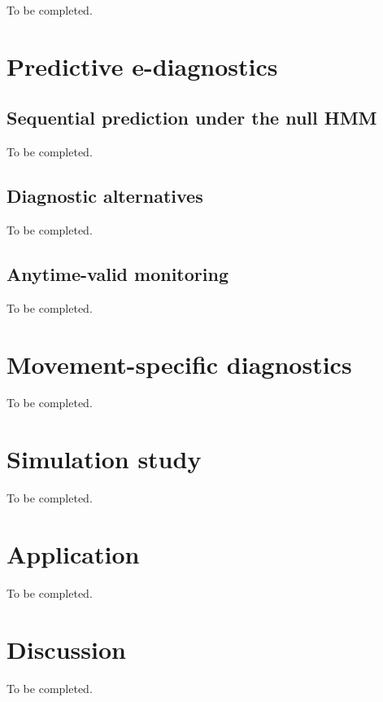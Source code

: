 \documentclass[11pt]{article}
\begin{document}
To be completed.

\section{Predictive e-diagnostics}

\subsection{Sequential prediction under the null HMM}

To be completed.

\subsection{Diagnostic alternatives}

To be completed.

\subsection{Anytime-valid monitoring}

To be completed.

\section{Movement-specific diagnostics}

To be completed.

\section{Simulation study}

To be completed.

\section{Application}

To be completed.

\section{Discussion}

To be completed.



\end{document}
